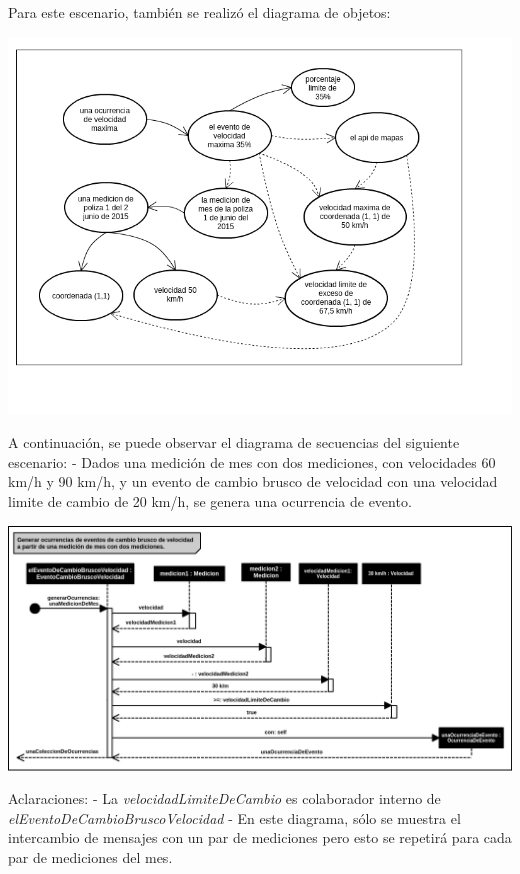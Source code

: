 Para este escenario, también se realizó el diagrama de objetos:
\newline

\centerline{\includegraphics[width=1\textwidth]{./imagenes/objetos_velmax.png}}



A continuación, se puede observar el diagrama de secuencias del siguiente escenario:\newline
- Dados una medición de mes con dos mediciones, con velocidades 60 km/h y 90 km/h, 
y un evento de cambio brusco de velocidad con una velocidad limite de cambio de 20 km/h, 
se genera una ocurrencia de evento.
\newline


\centerline{\includegraphics[width=1\textwidth]{./imagenes/secuencias_brusco.png}}


Aclaraciones:\newline
- La \textit{velocidadLimiteDeCambio} es colaborador interno de \textit{elEventoDeCambioBruscoVelocidad}\newline
- En este diagrama, sólo se muestra el intercambio de mensajes con un par de mediciones pero esto se 
repetirá para cada par de mediciones del mes.
